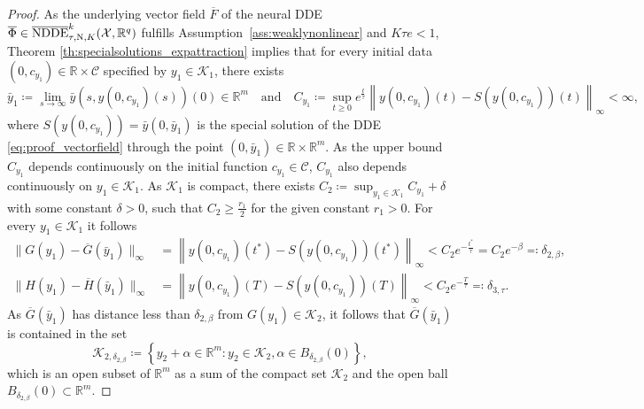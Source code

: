 \documentclass[10pt]{article}
\numberwithin{equation}{section}
\newcommand\norm[1]{\left\lVert#1\right\rVert}
\newcommand\normk[1]{\lVert#1\lVert}
\begin{document}
	
	\begin{proof}
		As the underlying vector field $\overline{F}$ of the neural DDE $\overline{\Phi}\in\overline{\textup{NDDE}}^k_{\tau,\textup{N},K}(\mathcal{X},\mathbb{R}^q)$ fulfills Assumption~\ref{ass:weaklynonlinear} and $K\tau e<1$, Theorem \ref{th:specialsolutions_expattraction} implies that for every initial data $(0,c_{y_1})\in\mathbb{R}\times \mathcal{C}$ specified by $y_1\in\mathcal{K}_1$, there exists
		\begin{equation*}
			\bar{y}_1 \coloneqq \lim_{s \rightarrow \infty} \bar{y}(s,y(0,c_{y_1})(s))(0) \in \mathbb{R}^m \quad \text{and} \quad C_{y_1} \coloneqq \sup_{t \geq 0} e^{\frac{t}{\tau}} \norm{y(0,c_{y_1})(t)-S(y(0,c_{y_1}))(t)}_\infty < \infty,
		\end{equation*}
		where $S(y(0,c_{y_1})) = \bar{y}(0,\bar{y}_1)$ is the special solution of the DDE \eqref{eq:proof_vectorfield} through the point $(0,\bar{y}_1)\in\mathbb{R}\times\mathbb{R}^m$. As the upper bound $C_{y_1}$ depends continuously on the initial function $c_{y_1}\in\mathcal{C}$, $C_{y_1}$ also depends continuously on $y_1\in \mathcal{K}_1$. As $\mathcal{K}_1$ is compact, there exists $C_2 \coloneqq \sup_{y_1 \in \mathcal{K}_1} C_{y_1}+\delta$ with some constant $\delta>0$, such that $C_2 \geq \frac{r_1}{2}$ for the given constant $r_1>0$. For every $y_1 \in \mathcal{K}_1$ it follows
		\begin{align*}
			\normk{G(y_1)-\overline{G}(\bar{y}_1)}_\infty &= \norm{y(0,c_{y_1})(t^\ast)-S(y(0,c_{y_1}))(t^\ast)}_\infty < C_2 e^{-\frac{t^\ast}{\tau}} = C_2 e^{-\beta} \eqqcolon \delta_{2,\beta}, \\
			\normk{H(y_1)-\overline{H}(\bar{y}_1)}_\infty &= \norm{y(0,c_{y_1})(T)-S(y(0,c_{y_1}))(T)}_\infty < C_2 e^{-\frac{T}{\tau}}  \eqqcolon \delta_{3,\tau}.
		\end{align*}
		As $\overline{G}(\bar{y}_1)$ has  distance less than $\delta_{2,\beta}$ from $G(y_1)\in \mathcal{K}_2$, it follows that $\overline{G}(\bar{y}_1)$ is contained in the set
		\begin{equation*}
			\mathcal{K}_{2,\delta_{2,\beta}} \coloneqq \left\{ y_2 + \alpha \in \mathbb{R}^m: y_2 \in \mathcal{K}_2, \alpha \in B_{\delta_{2,\beta}}(0)\right\},
		\end{equation*}
		which is an open subset of $\mathbb{R}^m$ as a sum of the compact set $\mathcal{K}_2$ and the open ball $B_{\delta_{2,\beta}}(0)\subset \mathbb{R}^m$.
	\end{proof}
	
\end{document}
